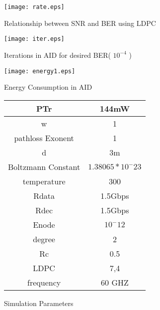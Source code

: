 \documentclass[3p,times,procedia]{elsarticle}
\begin{document}
  \begin{figure}[!ht]
    \begin{minipage}{0.49\linewidth}
    \texttt{[image: rate.eps]}
    \vspace{-0.5cm}
    \caption{Relationship between SNR and BER using LDPC}
    \end{minipage}
\begin{minipage}{0.49\linewidth}
    \texttt{[image: iter.eps]}
    \vspace{-0.5cm}
    \caption{Iterations in AID for desired BER( $10^{-4}$ )}
    \end{minipage}
\begin{minipage}{0.49\linewidth}
    \texttt{[image: energy1.eps]}
    \vspace{-0.5cm}
    \caption{Energy Consumption in AID}
    \end{minipage}
    \hspace{1cm}
    \begin{minipage}{0.49\linewidth}
\centering
    \scriptsize
\begin{tabular}{|c|c|}
\hline
       PTr &      144mW \\
\hline

         w &          1 \\
\hline

pathloss Exonent &          1 \\
\hline

         d &             3m \\
\hline

Boltzmann Constant & $1.38065*10^-23$ \\
\hline

temperature &        300 \\
\hline

     Rdata &    1.5Gbps \\
\hline

      Rdec &    1.5Gbps \\
\hline

     Enode &     $10^-12 $\\
\hline

    degree &          2 \\
\hline

        Rc &        0.5 \\
\hline

      LDPC &        7,4 \\
\hline

 frequency &     60 GHZ \\
\hline
\end{tabular}

\setlength{\hoffset}{-2cm}
\caption{Simulation Parameters}

    \end{minipage}
  \end{figure}
\end{document}
